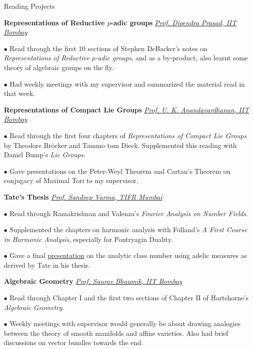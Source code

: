 \begin{rubric}{Reading Projects}
	
	\entry*[2024\phantom{}] \textbf{Representations of Reductive $p$-adic groups} \hfill \emph{\href{mailto:dprasad@iitb.ac.in}{Prof. Dipendra Prasad, IIT Bombay}}

	$\bullet$ Read through the first $10$ sections of Stephen DeBacker's notes on \emph{Representations of Reductive $p$-adic groups}, and as a by-product, also learnt some theory of algebraic groups on the fly.

	$\bullet$ Had weekly meetings with my supervisor and summarized the material read in that week.


	\entry*[2024\phantom{}] \textbf{Representations of Compact Lie Groups} \hfill \emph{\href{mailto:anand@math.iitb.ac.in}{Prof. U. K. Anandavardhanan, IIT Bombay}}

	$\bullet$ Read through the first four chapters of \emph{Representations of Compact Lie Groups} by Theodore Br\"ocker and Tammo tom Dieck. Supplemented this reading with Daniel Bump's \emph{Lie Groups}.

	$\bullet$ Gave presentations on the Peter-Weyl Theorem and Cartan's Theorem on conjugacy of Maximal Tori to my supervisor.


	\entry*[2024\phantom{}] \textbf{Tate's Thesis} \hfill \emph{\href{mailto:sandeepv@math.tifr.res.in}{Prof. Sandeep Varma, TIFR Mumbai}}

	$\bullet$ Read through Ramakrishnan and Valenza's \emph{Fourier Analysis on Number Fields}. 

	$\bullet$ Supplemented the chapters on harmonic analysis with Folland's \emph{A First Course in Harmonic Analysis}, especially for Pontryagin Duality.

	$\bullet$ Gave a final \href{https://swayamchube.github.io/math/vsrp/main.pdf}{presentation} on the analytic class number using adelic measures as derived by Tate in his thesis.


	\entry*[2024\phantom{}] \textbf{Algebraic Geometry} \hfill \emph{\href{mailto:saurav@math.iitb.ac.in}{Prof. Saurav Bhaumik, IIT Bombay}}

	$\bullet$ Read through Chapter I and the first two sections of Chapter II of Hartshorne's \emph{Algebraic Geometry}.

	$\bullet$ Weekly meetings with supervisor would generally be about drawing analogies between the theory of smooth manifolds and affine varieties. Also had brief discussions on vector bundles towards the end.


\end{rubric}
